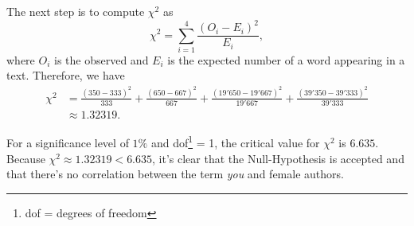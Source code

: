 \documentclass[a4paper]{article}
\begin{document}
\noindent The next step is to compute $\chi^2$ as
$$ \chi^2 = \sum_{i=1}^4 \frac{(O_i - E_i)^2}{E_i},$$
where $O_i$ is the observed and $E_i$ is the expected number of a word appearing in a text. Therefore, we have
\begin{align*}
\chi^2 &= \frac{(350-333)^2}{333} + \frac{(650 - 667)^2}{667} + \frac{(19'650-19'667)^2}{19'667} + \frac{(39'350-39'333)^2}{39'333} \\
 &\approx 1.32319.
\end{align*}

\noindent For a significance level of $1\%$ and dof\footnote{dof = degrees of freedom} = 1, the critical value for $\chi^2$ is $6.635$. Because $\chi^2 \approx 1.32319 < 6.635$, it's clear that the Null-Hypothesis is accepted and that there's no correlation between the term \textit{you} and female authors.
\end{document}
